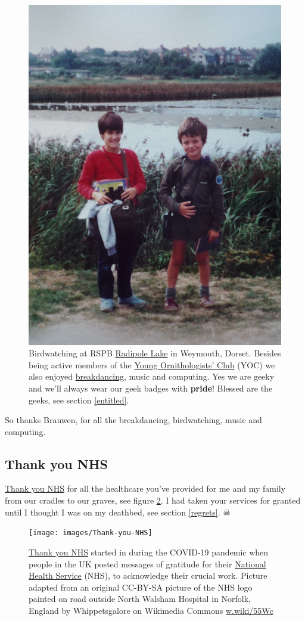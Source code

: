 \documentclass[
]{book}
\begin{document}
\begin{figure}

{\centering \includegraphics[width=0.5\linewidth]{images/radipole-lake} 

}

\caption{Birdwatching at RSPB \href{https://en.wikipedia.org/wiki/Radipole_Lake}{Radipole Lake} in Weymouth, Dorset. Besides being active members of the \href{https://en.wikipedia.org/wiki/Young_Ornithologists\%27_Club}{Young Ornithologists' Club} (YOC) we also enjoyed \href{https://en.wikipedia.org/wiki/Breakdancing}{breakdancing}, music and computing. Yes we are geeky and we'll always wear our geek badges with \textbf{pride}! Blessed are the geeks, see section \ref{entitled}.}\label{fig:branwen-fig}
\end{figure}



So thanks Branwen, for all the breakdancing, birdwatching, music and computing.

\hypertarget{thxnhs}{%
\subsection{Thank you NHS}\label{thxnhs}}

\href{https://en.wikipedia.org/wiki/Thank_You_NHS}{Thank you NHS} for all the healthcare you've provided for me and my family from our cradles to our graves, see figure \ref{fig:nhs-fig}. I had taken your services for granted until I thought I was on my deathbed, see section \ref{regrets}. ☠

\begin{figure}

{\centering \texttt{[image: images/Thank-you-NHS]} 

}

\caption{\href{https://en.wikipedia.org/wiki/Thank_You_NHS}{Thank you NHS} started in during the COVID-19 pandemic when people in the UK posted messages of gratitude for their \href{https://en.wikipedia.org/wiki/National_Health_Service}{National Health Service} (NHS), to acknowledge their crucial work. Picture adapted from an original CC-BY-SA picture of the NHS logo painted on road outside North Walsham Hospital in Norfolk, England by Whippetsgalore on Wikimedia Commons \href{https://w.wiki/55Wc}{w.wiki/55Wc}}\label{fig:nhs-fig}
\end{figure}
\end{document}
